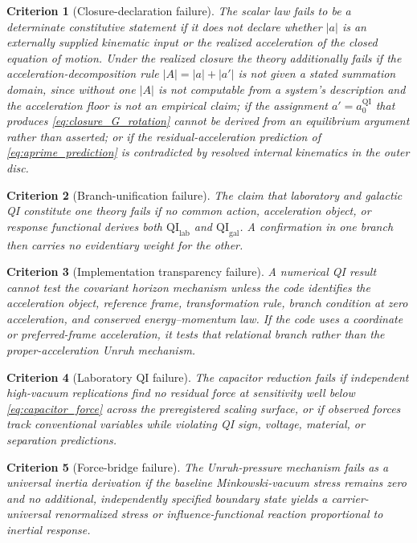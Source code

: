 \documentclass[11pt]{article}
\newtheorem{criterion}{Criterion}
\newcommand{\QI}{\mathrm{QI}}
\begin{document}
\begin{criterion}[Closure-declaration failure]
\label{crit:closure_declaration}
The scalar law fails to be a determinate constitutive statement if it does not declare whether \(|a|\) is an externally supplied kinematic input or the realized acceleration of the closed equation of motion. Under the realized closure the theory additionally fails if the acceleration-decomposition rule \(|A|=|a|+|a'|\) is not given a stated summation domain, since without one \(|A|\) is not computable from a system's description and the acceleration floor is not an empirical claim; if the assignment \(a'=a_{0}^{\QI}\) that produces \cref{eq:closure_G_rotation} cannot be derived from an equilibrium argument rather than asserted; or if the residual-acceleration prediction of \cref{eq:aprime_prediction} is contradicted by resolved internal kinematics in the outer disc.
\end{criterion}

\begin{criterion}[Branch-unification failure]
The claim that laboratory and galactic QI constitute one theory fails if no common action, acceleration object, or response functional derives both \(\mathrm{QI}_{\mathrm{lab}}\) and \(\mathrm{QI}_{\mathrm{gal}}\). A confirmation in one branch then carries no evidentiary weight for the other.
\end{criterion}

\begin{criterion}[Implementation transparency failure]
A numerical QI result cannot test the covariant horizon mechanism unless the code identifies the acceleration object, reference frame, transformation rule, branch condition at zero acceleration, and conserved energy--momentum law. If the code uses a coordinate or preferred-frame acceleration, it tests that relational branch rather than the proper-acceleration Unruh mechanism.
\end{criterion}

\begin{criterion}[Laboratory QI failure]
The capacitor reduction fails if independent high-vacuum replications find no residual force at sensitivity well below \cref{eq:capacitor_force} across the preregistered scaling surface, or if observed forces track conventional variables while violating QI sign, voltage, material, or separation predictions.
\end{criterion}

\begin{criterion}[Force-bridge failure]
The Unruh-pressure mechanism fails as a universal inertia derivation if the baseline Minkowski-vacuum stress remains zero and no additional, independently specified boundary state yields a carrier-universal renormalized stress or influence-functional reaction proportional to inertial response.
\end{criterion}
\end{document}
